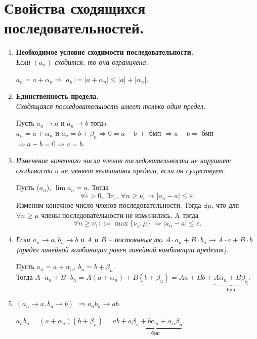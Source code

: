 \section{Свойства сходящихся последовательностей.}
\begin{enumerate}
	\item \textbf{Необходимое условие сходимости последовательности.}\\
	\textit{Если $(a_n)$ сходится, то она ограничена.}
	\begin{Proof}
		$a_n=a+\alpha_n \Rightarrow |a_n|=|a+\alpha_n|\leqslant|a|+|\alpha_n|$.
	\end{Proof}
	\item \textbf{Единственность предела.}\\
	\textit{Сходящаяся последовательность имеет только один предел.}
	\begin{Proof}
		Пусть $a_n\to a$ и $a_n \to b$ тогдa\\
		$a_n=a+\alpha_n$ и $a_n=b+\beta_n\Rightarrow 0=a-b\ +$ бмп $\Rightarrow a-b=$ бмп $\Rightarrow a-b=0 \Rightarrow a=b$.
	\end{Proof}
	\item \textit{Изменение конечного числа членов последовательности не нарушает сходимости и не меняет величинины предела, если он существует.}
	\begin{Proof}
		Пусть ($a_n$), $\lim a_n = a$.
		Тогда $$\forall \varepsilon > 0,\ \exists\nu_\varepsilon,\ \forall n \geqslant \nu_\varepsilon \Rightarrow |a_n-a| \leqslant\varepsilon.$$
		Изменим конечное число членов последовательности. Тогда $\exists\mu$, что для $\forall n \geqslant \mu$ члены последовательности не измeнились. A тогда $$\forall n \geqslant\nu_1 ::=\max\{\nu_\varepsilon,\mu\}\ \Rightarrow|a_n-a|\leqslant\varepsilon.$$
	\end{Proof}
	\item \textit{Если $a_n \to a, b_n \to b$ и $A$ и $B$ -- постоянные,то $A\cdot a_n + B\cdot b_n \to A\cdot a + B \cdot b$ (предел линейной комбинации равен линейной комбинации пределов).}
	\begin{Proof}
		Пусть $a_n=a+\alpha_n,\ b_n=b+\beta_n$.\\
		Тогда $A\cdot a_n + B \cdot b_n = A(a+\alpha_n)+B(b+\beta_u)=Aa+Bb+\underbrace{A\alpha_n+B\beta_u}_{\text{бмп}}.$
	\end{Proof}
	\item \textit{$(a_n \to a, b_n \to b)$ $\Rightarrow a_n b_n \to ab$.}
	\begin{Proof}
		$a_n b_n=(a+\alpha_n)(b+\beta_n)=ab+\underbrace{a\beta_u+b\alpha_n+\alpha_n\beta_n}_{\text{бмп}}$.

\end{Proof}
\end{enumerate}
